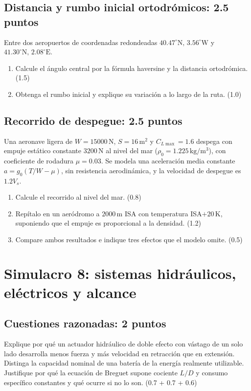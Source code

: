 \section{Distancia y rumbo inicial ortodrómicos: 2.5 puntos}
Entre dos aeropuertos de coordenadas redondeadas $40.47^\circ\mathrm N,\,3.56^\circ\mathrm W$ y $41.30^\circ\mathrm N,\,2.08^\circ\mathrm E$.
\begin{enumerate}[label=\alph*)]
\item Calcule el ángulo central por la fórmula haversine y la distancia ortodrómica. (1.5)
\item Obtenga el rumbo inicial y explique su variación a lo largo de la ruta. (1.0)
\end{enumerate}
\section{Recorrido de despegue: 2.5 puntos}
Una aeronave ligera de $W=15000\,\mathrm N$, $S=16\,\mathrm{m^2}$ y $C_{L\max}=1.6$ despega con empuje estático constante $3200\,\mathrm N$ al nivel del mar ($\rho_0=1.225\,\mathrm{kg/m^3}$), con coeficiente de rodadura $\mu=0.03$. Se modela una aceleración media constante $a=g_0(T/W-\mu)$, sin resistencia aerodinámica, y la velocidad de despegue es $1.2V_s$.
\begin{enumerate}[label=\alph*)]
\item Calcule el recorrido al nivel del mar. (0.8)
\item Repítalo en un aeródromo a $2000\,\mathrm m$ ISA con temperatura ISA$+20\,\mathrm K$, suponiendo que el empuje es proporcional a la densidad. (1.2)
\item Compare ambos resultados e indique tres efectos que el modelo omite. (0.5)
\end{enumerate}

\chapter{Simulacro 8: sistemas hidráulicos, eléctricos y alcance}
\section{Cuestiones razonadas: 2 puntos}
Explique por qué un actuador hidráulico de doble efecto con vástago de un solo lado desarrolla menos fuerza y más velocidad en retracción que en extensión. Distinga la capacidad nominal de una batería de la energía realmente utilizable. Justifique por qué la ecuación de Breguet supone cociente $L/D$ y consumo específico constantes y qué ocurre si no lo son. (0.7 + 0.7 + 0.6)
